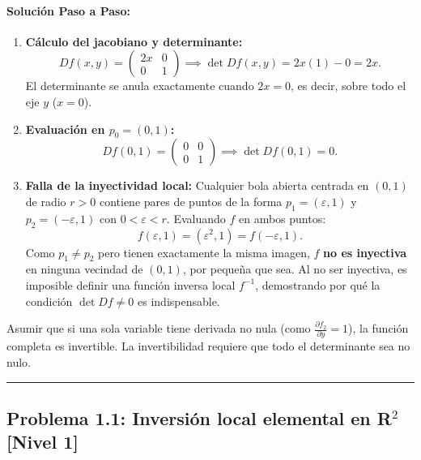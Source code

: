 \documentclass[11pt,a4paper]{article}
\begin{document}
\paragraph{Solución Paso a Paso:}\par
\begin{enumerate}[label=\textbf{\arabic*.}]
\item \textbf{Cálculo del jacobiano y determinante:}
\[ Df(x,y) = \begin{pmatrix} 2x & 0 \\[4pt] 0 & 1 \end{pmatrix} \implies \det Df(x,y) = 2x(1) - 0 = 2x. \]
El determinante se anula exactamente cuando $2x = 0$, es decir, sobre todo el eje $y$ ($x = 0$).
\item \textbf{Evaluación en $p_0 = (0,1)$:}
\[ Df(0,1) = \begin{pmatrix} 0 & 0 \\[4pt] 0 & 1 \end{pmatrix} \implies \det Df(0,1) = 0. \]
\item \textbf{Falla de la inyectividad local:}
Cualquier bola abierta centrada en $(0,1)$ de radio $r > 0$ contiene pares de puntos de la forma $p_1 = (\varepsilon, 1)$ y $p_2 = (-\varepsilon, 1)$ con $0 < \varepsilon < r$. Evaluando $f$ en ambos puntos:
\[ f(\varepsilon, 1) = (\varepsilon^2, 1) = f(-\varepsilon, 1). \]
Como $p_1 \neq p_2$ pero tienen exactamente la misma imagen, $f$ \textbf{no es inyectiva} en ninguna vecindad de $(0,1)$, por pequeña que sea. Al no ser inyectiva, es imposible definir una función inversa local $f^{-1}$, demostrando por qué la condición $\det Df \neq 0$ es indispensable.
\end{enumerate}

\begin{trapbox}
Asumir que si una sola variable tiene derivada no nula (como $\frac{\partial f_2}{\partial y} = 1$), la función completa es invertible. La invertibilidad requiere que todo el determinante sea no nulo.
\end{trapbox}

\vspace{0.5cm}
\hrule
\vspace{0.5cm}


\subsection*{Problema 1.1: Inversión local elemental en R$^2$ \hfill \color{primaryblue}\small[Nivel 1]}
\end{document}
